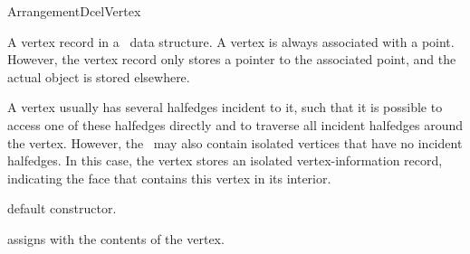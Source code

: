 
\ccRefPageBegin

\begin{ccRefConcept}{ArrangementDcelVertex}

\ccDefinition

A vertex record in a \dcel\ data structure. A vertex is always associated
with a point. However, the vertex record only stores a pointer to the
associated point, and the actual  object is stored elsewhere.

A vertex usually has several halfedges incident to it, such that it is
possible to access one of these halfedges directly and to traverse all
incident halfedges around the vertex. However, the \dcel\ may also contain
isolated vertices that have no incident halfedges. In this case, the vertex
stores an isolated vertex-information record, indicating the face that
contains this vertex in its interior.


\ccTypes

\ccGlue
{}


\ccCreation

   {default constructor.}

   {assigns \ccVar{} with the contents of the  vertex.}

\end{ccRefConcept}
